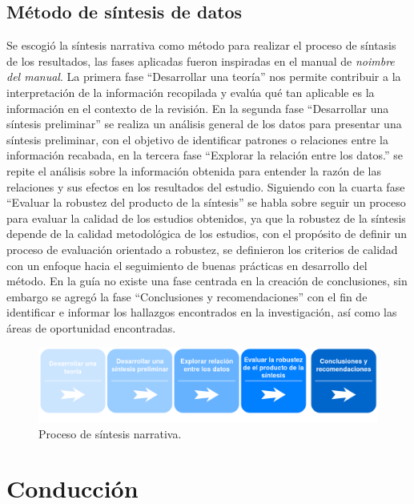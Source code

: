 \documentclass[conference,onecolumn,10pt]{IEEEtran}
\begin{document}
\subsection{Método de síntesis de datos}
Se escogió la síntesis narrativa como método para realizar el proceso de síntasis de los resultados, las fases aplicadas fueron 
inspiradas en el manual de \emph{noimbre del manual}. La primera fase “Desarrollar una teoría” nos permite contribuir a la 
interpretación de la información recopilada y evalúa qué tan aplicable es la información en el contexto de la revisión. 
En la segunda fase “Desarrollar una síntesis preliminar” se realiza un análisis general de los datos para presentar una síntesis 
preliminar, con el objetivo de identificar patrones o relaciones entre la información recabada, en la tercera fase 
“Explorar la relación entre los datos.” se repite el análisis sobre la información obtenida para entender la razón de las relaciones y sus efectos 
en los resultados del estudio. Siguiendo con la cuarta fase “Evaluar la robustez del producto de la síntesis” se habla sobre seguir un proceso 
para evaluar la calidad de los estudios obtenidos, ya que la robustez de la síntesis depende de la calidad metodológica de los estudios, con el 
propósito de definir un proceso de evaluación orientado a robustez, se definieron los criterios de calidad con un enfoque hacia el seguimiento de 
buenas prácticas en desarrollo del método. 
En la guía no existe una fase centrada en la creación de conclusiones, sin embargo se agregó la fase “Conclusiones y recomendaciones” 
con el fin de identificar e informar los hallazgos encontrados en la investigación, así como las áreas de oportunidad encontradas.

\begin{figure}[!htb]
   \includegraphics[width=\linewidth]{narrativa.png}
   \caption{Proceso de síntesis narrativa.}
   \label{fig:sistesisnarrativa}
\end{figure}
\newpage

\section{Conducción}
\end{document}
